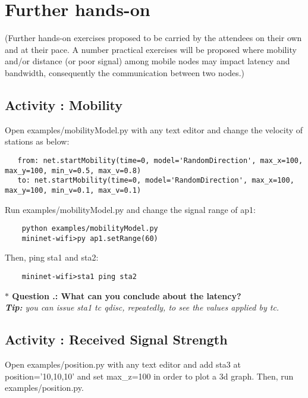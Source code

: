\section{Further hands-on}
(Further hands-on exercises proposed to be carried by the attendees on their own and at their pace.
	A number practical exercises will be proposed where mobility and/or distance (or poor signal) among mobile nodes may impact latency and bandwidth, consequently the communication between two nodes.)


\setcounter{question}{1}
\subsection{Activity \themycounter{}: Mobility}  


\noindent Open examples/mobilityModel.py with any text editor and change the velocity of stations as below:
\begin{verbatim}
   from: net.startMobility(time=0, model='RandomDirection', max_x=100, max_y=100, min_v=0.5, max_v=0.8)
   to: net.startMobility(time=0, model='RandomDirection', max_x=100, max_y=100, min_v=0.1, max_v=0.1)
\end{verbatim}

\noindent Run examples/mobilityModel.py and change the signal range of ap1:
\begin{verbatim}
    python examples/mobilityModel.py
    mininet-wifi>py ap1.setRange(60)
\end{verbatim}

\noindent Then, ping sta1 and sta2:
\begin{verbatim}
    mininet-wifi>sta1 ping sta2
\end{verbatim}

\noindent \textbf{$\ast$ Question \themycounter.\thequestion{}: What can you conclude about the latency?}\\
\textit{\textbf{Tip:} you can issue sta1 tc qdisc, repeatedly, to see the values applied by tc.}


\setcounter{question}{1}
\subsection{Activity \themycounter{}: Received Signal Strength} 

\noindent Open examples/position.py with any text editor and add sta3 at position='10,10,10' and set max\_z=100 in order to plot a 3d graph. Then, run examples/position.py.\\

